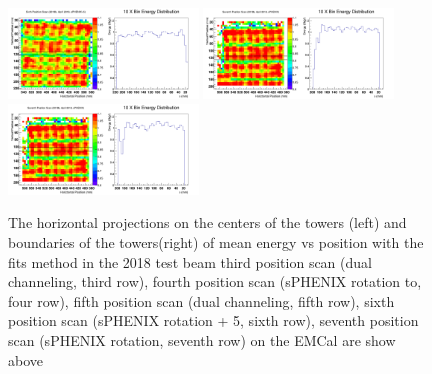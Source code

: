 \documentclass[hidelinks,11pt]{article}
\numberwithin{figure}{section}
\numberwithin{table}{section}
\begin{document}
\begin{figure}[hbtp]
\begin{center}
\includegraphics[width=0.45\textwidth]{Plots/2018/6th/CombY6.png}
\includegraphics[width=0.45\textwidth]{Plots/2018/7th/CombY5.png}
\includegraphics[width=0.45\textwidth]{Plots/2018/7th/CombY6.png}
\caption{The horizontal projections on the centers of the towers (left) and boundaries of the towers(right) of mean energy vs position with the fits method in the 2018 test beam third position scan (dual channeling, third row), fourth position scan (sPHENIX rotation to, four row), fifth position scan (dual channeling, fifth row), sixth position scan (sPHENIX rotation + 5, sixth row),  seventh position scan (sPHENIX rotation, seventh row) on the EMCal are show above}
\label{fig:1DProjCenH2018}
\end{center}
\end{figure} 
\end{document}
